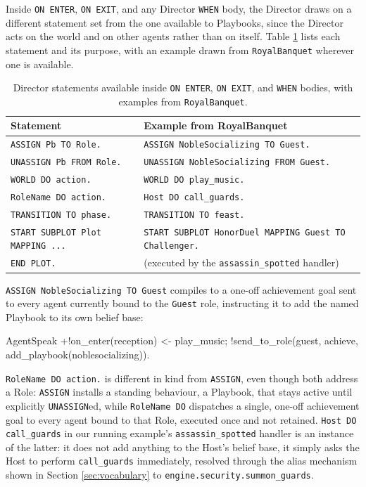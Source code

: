 Inside \lstinline|ON ENTER|, \lstinline|ON EXIT|, and any Director \lstinline|WHEN| body, the Director draws on a different statement set from the one available to Playbooks, since the Director acts on the world and on other agents rather than on itself. Table \ref{tab:director-stmt-mapping} lists each statement and its purpose, with an example drawn from \lstinline|RoyalBanquet| wherever one is available.

\begin{table}[h]
\centering
\begin{tabular}{|l|l|}
\hline
\textbf{Statement} & \textbf{Example from RoyalBanquet} \\
\hline
\lstinline|ASSIGN Pb TO Role.| & \lstinline|ASSIGN NobleSocializing TO Guest.| \\
\lstinline|UNASSIGN Pb FROM Role.| & \lstinline|UNASSIGN NobleSocializing FROM Guest.| \\
\lstinline|WORLD DO action.| & \lstinline|WORLD DO play_music.| \\
\lstinline|RoleName DO action.| & \lstinline|Host DO call_guards.| \\
\lstinline|TRANSITION TO phase.| & \lstinline|TRANSITION TO feast.| \\
\lstinline|START SUBPLOT Plot MAPPING ...| & \lstinline|START SUBPLOT HonorDuel MAPPING Guest TO Challenger.| \\
\lstinline|END PLOT.| & (executed by the \lstinline|assassin_spotted| handler) \\
\hline
\end{tabular}
\caption{Director statements available inside \lstinline|ON ENTER|, \lstinline|ON EXIT|, and \lstinline|WHEN| bodies, with examples from \lstinline|RoyalBanquet|.}
\label{tab:director-stmt-mapping}
\end{table}

\lstinline|ASSIGN NobleSocializing TO Guest| compiles to a one-off achievement goal sent to every agent currently bound to the \lstinline|Guest| role, instructing it to add the named Playbook to its own belief base:

\begin{codeblock}[]{AgentSpeak}
+!on_enter(reception) <-
    play_music;
    !send_to_role(guest, achieve, add_playbook(noblesocializing)).
\end{codeblock}

\lstinline|RoleName DO action.| is different in kind from \lstinline|ASSIGN|, even though both address a Role: \lstinline|ASSIGN| installs a standing behaviour, a Playbook, that stays active until explicitly \lstinline|UNASSIGN|ed, while \lstinline|RoleName DO| dispatches a single, one-off achievement goal to every agent bound to that Role, executed once and not retained. \lstinline|Host DO call_guards| in our running example's \lstinline|assassin_spotted| handler is an instance of the latter: it does not add anything to the Host's belief base, it simply asks the Host to perform \lstinline|call_guards| immediately, resolved through the alias mechanism shown in Section \ref{sec:vocabulary} to \lstinline|engine.security.summon_guards|.

